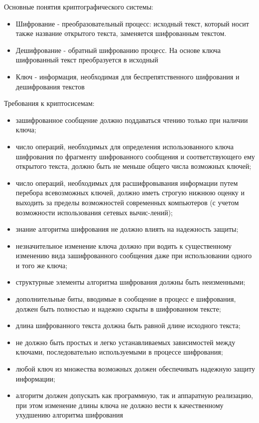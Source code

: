 Основные понятия криптографического системы:
\begin{itemize}[noitemsep,nolistsep]
	\item Шифрование - преобразовательный процесс: исходный текст, который носит также название открытого текста, заменяется шифрованным текстом. 
	\item Дешифрование - обратный шифрованию процесс. На основе ключа шифрованный текст преобразуется в исходный
	\item Ключ - информация, необходимая для беспрепятственного шифрования и дешифрования текстов
\end{itemize}
Требования к криптосисемам:
\begin{itemize}[noitemsep,nolistsep]
	\item зашифрованное сообщение должно поддаваться чтению только при наличии ключа; 
	\item число операций, необходимых для определения использованного ключа шифрования по фрагменту шифрованного сообщения и соответствующего ему открытого текста, должно быть не меньше общего числа возможных ключей;
	\item число операций, необходимых для расшифровывания информации путем перебора всевозможных ключей, должно иметь строгую нижнюю оценку и выходить за пределы возможностей современных компьютеров (с учетом возможности использования сетевых вычис-лений);
	\item знание алгоритма шифрования не должно влиять на надежность защиты; 
	\item незначительное изменение ключа должно при водить к существенному изменению вида зашифрованного сообщения даже при использовании одного и того же ключа;
	\item структурные элементы алгоритма шифрования должны быть неизменными; 
	\item дополнительные биты, вводимые в сообщение в процесс е шифрования, должен быть полностью и надежно скрыты в шифрованном тексте;
	\item длина шифрованного текста должна быть равной длине исходного текста; 
	\item не должно быть простых и легко устанавливаемых зависимостей между ключами, последовательно используемыми в процессе шифрования;
	\item любой ключ из множества возможных должен обеспечивать надежную защиту информации; 
	\item алгоритм должен допускать как программную, так и аппаратную реализацию, при этом изменение длины ключа не должно вести к качественному ухудшению алгоритма шифрования
\end{itemize}
